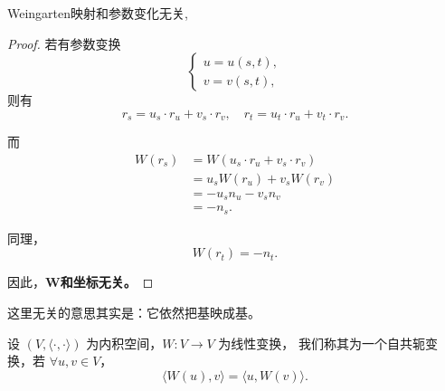 \documentclass[lang=cn,10pt,thmcnt=section]{elegantbook}
\begin{document}
\begin{proposition}
    Weingarten映射和参数变化无关,
\end{proposition}
\begin{proof}
   
若有参数变换
\[
\begin{cases}
u = u(s,t), \\
v = v(s,t),
\end{cases}
\]
则有
\[
r_s = u_s \cdot r_u + v_s \cdot r_v,
\quad
r_t = u_t \cdot r_u + v_t \cdot r_v.
\]

而
\[
\begin{aligned}
W(r_s) &= W(u_s \cdot r_u + v_s \cdot r_v) \\
&= u_s W(r_u) + v_s W(r_v) \\
&= -u_s n_u - v_s n_v \\
&= -n_s.
\end{aligned}
\]

同理，
\[
W(r_t) = -n_t.
\]

\medskip

\noindent
因此，\textbf{W和坐标无关。}
\end{proof}
\begin{remark}
    这里无关的意思其实是：它依然把基映成基。
\end{remark}

\begin{definition}[自共轭变换]
    设 $(V, \langle \cdot, \cdot \rangle)$ 为内积空间，$W: V \to V$ 为线性变换，
    我们称其为一个自共轭变换，若 $\forall u, v \in V$，
    \[
    \langle W(u), v \rangle = \langle u, W(v) \rangle.
    \]
    \end{definition}
    
\end{document}
